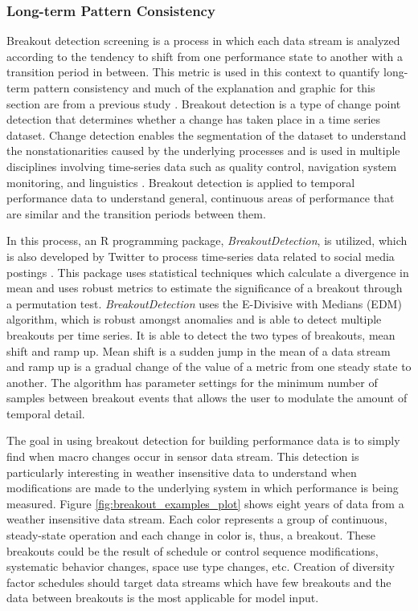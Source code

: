     \subsubsection{Long-term Pattern Consistency}
\label{sec:patternconsistency}

Breakout detection screening is a process in which each data stream is analyzed according to the tendency to shift from one performance state to another with a transition period in between. This metric is used in this context to quantify long-term pattern consistency and much of the explanation and graphic for this section are from a previous study \cite{miller_forensically_2015}. Breakout detection is a type of change point detection that determines whether a change has taken place in a time series dataset. Change detection enables the segmentation of the dataset to understand the nonstationarities caused by the underlying processes and is used in multiple disciplines involving time-series data such as quality control, navigation system monitoring, and linguistics \cite{basseville_detection_1993}. Breakout detection is applied to temporal performance data to understand general, continuous areas of performance that are similar and the transition periods between them.

In this process, an R programming package, \emph{BreakoutDetection}, is utilized, which is also developed by Twitter to process time-series data related to social media postings \cite{twitter_breakoutdetection}. This package uses statistical techniques which calculate a divergence in mean and uses robust metrics to estimate the significance of a breakout through a permutation test. \emph{BreakoutDetection} uses the E-Divisive with Medians (EDM) algorithm, which is robust amongst anomalies and is able to detect multiple breakouts per time series. It is able to detect the two types of breakouts, mean shift and ramp up. Mean shift is a sudden jump in the mean of a data stream and ramp up is a gradual change of the value of a metric from one steady state to another. The algorithm has parameter settings for the minimum number of samples between breakout events that allows the user to modulate the amount of temporal detail.

The goal in using breakout detection for building performance data is to simply find when macro changes occur in sensor data stream. This detection is particularly interesting in weather insensitive data to understand when modifications are made to the underlying system in which performance is being measured. Figure \ref{fig:breakout_examples_plot} shows eight years of data from a weather insensitive data stream. Each color represents a group of continuous, steady-state operation and each change in color is, thus, a breakout. These breakouts could be the result of schedule or control sequence modifications, systematic behavior changes, space use type changes, etc. Creation of diversity factor schedules should target data streams which have few breakouts and the data between breakouts is the most applicable for model input.